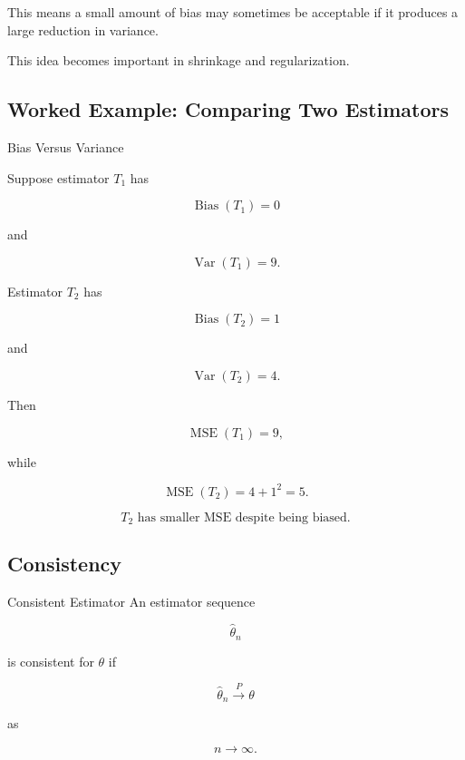 This means a small amount of bias may sometimes be acceptable if it
produces a large reduction in variance.

This idea becomes important in shrinkage and regularization.

\subsection{Worked Example: Comparing Two Estimators}
\label{subsec:worked-comparing-estimators}

\begin{workedexamplebox}{Bias Versus Variance}

Suppose estimator \(T_1\) has

\[
\operatorname{Bias}(T_1)=0
\]

and

\[
\operatorname{Var}(T_1)=9.
\]

Estimator \(T_2\) has

\[
\operatorname{Bias}(T_2)=1
\]

and

\[
\operatorname{Var}(T_2)=4.
\]

Then

\[
\operatorname{MSE}(T_1)=9,
\]

while

\[
\operatorname{MSE}(T_2)
=
4+1^2
=
5.
\]

\begin{answerbox}
\[
\boxed{
T_2
\text{ has smaller MSE despite being biased.}
}
\]
\end{answerbox}

\end{workedexamplebox}

\subsection{Consistency}
\label{subsec:consistency-estimation}

\begin{definitionbox}{Consistent Estimator}
An estimator sequence

\[
\widehat{\theta}_n
\]

is consistent for \(\theta\) if

\[
\boxed{
\widehat{\theta}_n
\xrightarrow{P}
\theta
}
\]

as

\[
n\to\infty.
\]
\end{definitionbox}

